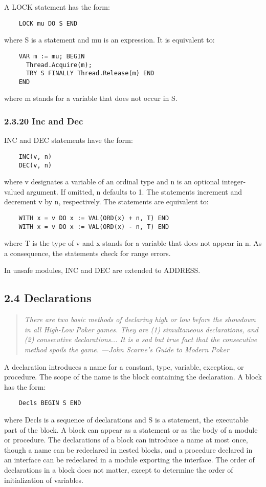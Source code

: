\documentclass[10pt]{article}
\begin{document}
A LOCK statement has the form:
\begin{verbatim}
    LOCK mu DO S END
\end{verbatim}
where S is a statement and mu is an expression.  It is equivalent to:
\begin{verbatim}
    VAR m := mu; BEGIN
      Thread.Acquire(m);
      TRY S FINALLY Thread.Release(m) END
    END
\end{verbatim}
where m stands for a variable that does not occur in S.

\subsubsection*{2.3.20 Inc and Dec}

INC and DEC statements have the form:
\begin{verbatim}
    INC(v, n)
    DEC(v, n)
\end{verbatim}
where v designates a variable of an ordinal type and n is an optional
integer-valued argument.  If omitted, n defaults to 1.  The statements increment
and decrement v by n, respectively.  The statements are equivalent to:
\begin{verbatim}
    WITH x = v DO x := VAL(ORD(x) + n, T) END
    WITH x = v DO x := VAL(ORD(x) - n, T) END
\end{verbatim}
where T is the type of v and x stands for a variable that does not appear in
n.  As a consequence, the statements check for range errors.

In unsafe modules, INC and DEC are extended to ADDRESS.

\subsection*{2.4 Declarations}

\begin{quote}
  \emph{ There are two basic methods of declaring high or low before the
    showdown in all High-Low Poker games.  They are (1) simultaneous
    declarations, and (2) consecutive declarations... It is a sad but true
    fact that the consecutive method spoils the game.  ---John Scarne's Guide
    to Modern Poker }
\end{quote}

A declaration introduces a name for a constant, type, variable, exception, or
procedure.  The scope of the name is the block containing the declaration.  A
block has the form:
\begin{verbatim}
    Decls BEGIN S END
\end{verbatim}
where Decls is a sequence of declarations and S is a statement, the executable
part of the block.  A block can appear as a statement or as the body of a
module or procedure.  The declarations of a block can introduce a name at most
once, though a name can be redeclared in nested blocks, and a procedure
declared in an interface can be redeclared in a module exporting the
interface.  The order of declarations in a block does not matter, except to
determine the order of initialization of variables.
\end{document}
